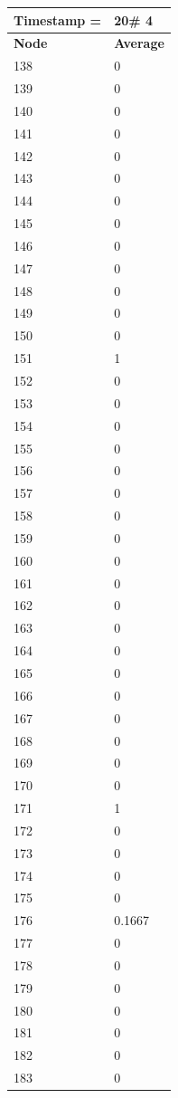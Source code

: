 \begin{tabular}{|l||l|}
\hline
\textbf{Timestamp =} & \textbf{20}\# 4\\\hline
	\textbf{Node} & \textbf{Average} \\ \hline
\hline
	138 & 0 \\ \hline
	139 & 0 \\ \hline
	140 & 0 \\ \hline
	141 & 0 \\ \hline
	142 & 0 \\ \hline
	143 & 0 \\ \hline
	144 & 0 \\ \hline
	145 & 0 \\ \hline
	146 & 0 \\ \hline
	147 & 0 \\ \hline
	148 & 0 \\ \hline
	149 & 0 \\ \hline
	150 & 0 \\ \hline
	151 & 1 \\ \hline
	152 & 0 \\ \hline
	153 & 0 \\ \hline
	154 & 0 \\ \hline
	155 & 0 \\ \hline
	156 & 0 \\ \hline
	157 & 0 \\ \hline
	158 & 0 \\ \hline
	159 & 0 \\ \hline
	160 & 0 \\ \hline
	161 & 0 \\ \hline
	162 & 0 \\ \hline
	163 & 0 \\ \hline
	164 & 0 \\ \hline
	165 & 0 \\ \hline
	166 & 0 \\ \hline
	167 & 0 \\ \hline
	168 & 0 \\ \hline
	169 & 0 \\ \hline
	170 & 0 \\ \hline
	171 & 1 \\ \hline
	172 & 0 \\ \hline
	173 & 0 \\ \hline
	174 & 0 \\ \hline
	175 & 0 \\ \hline
	176 & 0.1667 \\ \hline
	177 & 0 \\ \hline
	178 & 0 \\ \hline
	179 & 0 \\ \hline
	180 & 0 \\ \hline
	181 & 0 \\ \hline
	182 & 0 \\ \hline
	183 & 0 \\ \hline
\end{tabular}
